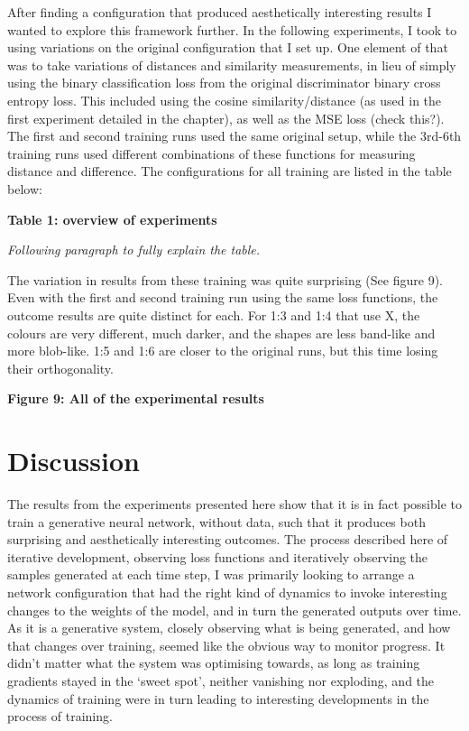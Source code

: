 After finding a configuration that produced aesthetically interesting results I wanted to explore this framework further. 
In the following experiments, I took to using variations on the original configuration that I set up. 
One element of that was to take variations of distances and similarity measurements, in lieu of simply using the binary classification loss from the original discriminator binary cross entropy loss. 
This included using the cosine similarity/distance (as used in the first experiment detailed in the chapter), as well as the MSE loss (check this?). 
The first and second training runs used the same original setup, while the 3rd-6th training runs used different combinations of these functions for measuring distance and difference. 
The configurations for all training are listed in the table below:

\textbf{Table 1: overview of experiments}

\textit{Following paragraph to fully explain the table.}

The variation in results from these training was quite surprising (See figure 9). 
Even with the first and second training run using the same loss functions, the outcome results are quite distinct for each. 
For 1:3 and 1:4 that use X, the colours are very different, much darker, and the shapes are less band-like and more blob-like. 
1:5 and 1:6 are closer to the original runs, but this time losing their orthogonality. 

\textbf{Figure 9: All of the experimental results}

\section{Discussion}

The results from the experiments presented here show that it is in fact possible to train a generative neural network, without data, such that it produces both surprising and aesthetically interesting outcomes. 
The process described here of iterative development, observing loss functions and iteratively observing the samples generated at each time step, I was primarily looking to arrange a network configuration that had the right kind of dynamics to invoke interesting changes to the weights of the model, and in turn the generated outputs over time. 
As it is a generative system, closely observing what is being generated, and how that changes over training, seemed like the obvious way to monitor progress. 
It didn’t matter what the system was optimising towards, as long as training gradients stayed in the `sweet spot’, neither vanishing nor exploding, and the dynamics of training were in turn leading to interesting developments in the process of training. 

